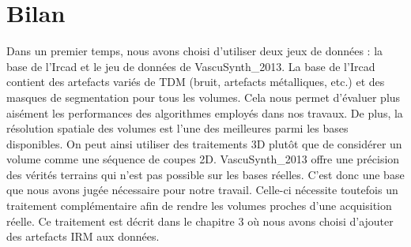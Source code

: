 \section{Bilan}
\label{sec:contexte:bilan}
Dans un premier temps, nous avons choisi d'utiliser deux jeux de données : la base de l'Ircad et le jeu de données de VascuSynth\_2013. La base de l'Ircad contient des artefacts variés de TDM (bruit, artefacts métalliques, etc.) et des masques de segmentation pour tous les volumes. Cela nous permet d'évaluer plus aisément les performances des algorithmes employés dans nos travaux. De plus, la résolution spatiale des volumes est l'une des meilleures parmi les bases disponibles. On peut ainsi utiliser des traitements 3D plutôt que de considérer un volume comme une séquence de coupes 2D. VascuSynth\_2013 offre une précision des vérités terrains qui n'est pas possible sur les bases réelles. C'est donc une base que nous avons jugée nécessaire pour notre travail. Celle-ci nécessite toutefois un traitement complémentaire afin de rendre les volumes proches d'une acquisition réelle. Ce traitement est décrit dans le chapitre 3 où nous avons choisi d'ajouter des artefacts IRM aux données.


